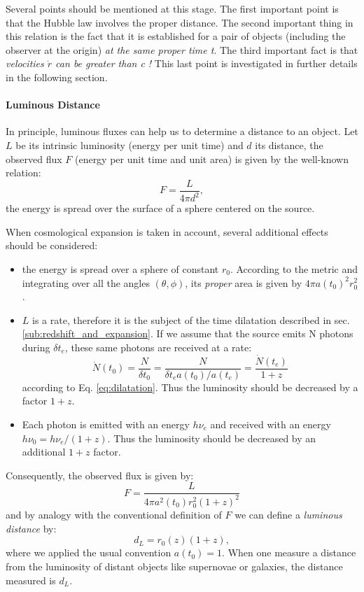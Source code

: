 Several points should be mentioned at this stage. The first important point is that the Hubble law involves the proper distance. The second important thing in this relation is the fact that it is established for a pair of objects (including the observer at the origin) \emph{at the same proper time t}. The third important fact is that \emph{velocities $\dot r$ can be greater than c !} This last point is investigated in further details in the following section.

\paragraph{Luminous Distance} %
\label{par:luminous_distance}
In principle, luminous fluxes can help us to determine a distance to an object. Let $L$ be its intrinsic luminosity (energy per unit time) and $d$ its distance, the observed flux $F$ (energy per unit time and unit area) is given by the well-known relation:
\begin{equation}
	F=\frac{L}{4\pi d^2},
\end{equation}
the energy is spread over the surface of a sphere centered on the source. 

When cosmological expansion is taken in account, several additional effects should be considered:
\begin{itemize}
	\item the energy is spread over a sphere of constant $r_0$. According to the metric and integrating over all the angles $(\theta,\phi)$, its \emph{proper} area is given by $4\pi a(t_0)^2r_0^2$.
	\item $L$ is a rate, therefore it is the subject of the time dilatation described in sec. \ref{sub:redshift_and_expansion}. If we assume that the source emits N photons during $\delta t_e$, these same photons are received at a rate:
	\begin{equation}
		\dot N(t_0)=\frac{N}{\delta t_0}=\frac{N}{\delta t_e a(t_0)/a(t_e)}=\frac{\dot N(t_e)}{1+z}
	\end{equation}
	according to Eq. \ref{eq:dilatation}. Thus the luminosity should be decreased by a factor $1+z$.
	\item Each photon is emitted with an energy $h\nu_e$ and received with an energy $h\nu_0=h\nu_e/(1+z)$. Thus the luminosity should be decreased by an additional $1+z$ factor.
\end{itemize}

Consequently, the observed flux is given by:
\begin{equation}
	F=\frac{L}{4\pi a^2(t_0)r_0^2(1+z)^2}
\end{equation} 
and by analogy with the conventional definition of $F$ we can define a \emph{luminous distance} by:
\begin{equation}
	d_L=r_0(z) (1+z),
	\label{eq:lumdist}
\end{equation}
where we applied the usual convention $a(t_0)=1$.
When one measure a distance from the luminosity of distant objects like supernovae or galaxies, the distance measured is $d_L$.
